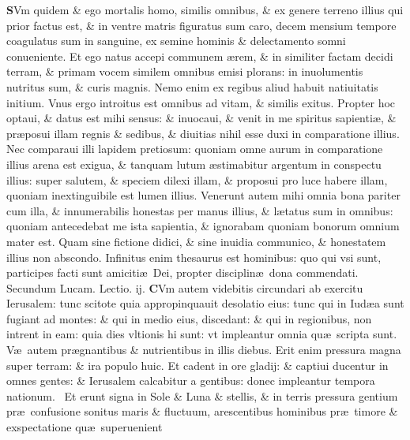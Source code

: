 \documentclass[a5paper,10pt]{book}
\def\leftmarginnote{%
	\lrmarginnote{\hskip -\marginparsep \hskip -6.5em}}
\def\rightmarginnote{%
	\lrmarginnote{\hskip\columnwidth \hskip -1em}}
\def\ae{æ}
\begin{document}
\begin{multicols*}{2}
\vspace{-1.25em}
\lettrine[lines=2]{\bfseries S}{}Vm\leftmarginnote{\begin{flushright}ca. 7.\end{flushright}} quidem \& ego mortalis homo, similis omnibus, \& ex genere terreno illius qui prior factus est, \& in ventre matris figuratus sum caro, decem mensium tempore coagulatus sum in sanguine, ex semine hominis \& delectamento somni conueniente.
Et ego natus accepi communem \ae rem, \& in similiter factam decidi terram, \& primam vocem similem omnibus emisi plorans: in inuolumentis nutritus sum, \& curis magnis.
Nemo enim ex regibus aliud habuit natiuitatis initium.
Vnus ergo introitus est omnibus ad vitam, \& similis exitus. Propter hoc optaui, \& datus est mihi sensus: \& inuocaui, \& venit in me spiritus sapienti\ae , \& pr\ae posui illam regnis \& sedibus, \& diuitias nihil esse duxi in comparatione illius.
Nec comparaui illi lapidem pretiosum: quoniam omne aurum in comparatione illius arena est exigua, \& tanquam lutum \ae stimabitur argentum in conspectu illius: super salutem, \& speciem dilexi illam, \& proposui pro luce habere illam, quoniam inextinguibile est lumen illius.
Venerunt autem mihi omnia bona pariter cum illa, \& innumerabilis honestas per manus illius, \& l\ae tatus sum in omnibus: quoniam antecedebat me ista sapientia, \& ignorabam quoniam bonorum omnium mater est.
Quam sine fictione didici, \& sine inuidia communico, \& honestatem illius non abscondo.
Infinitus enim thesaurus est hominibus: quo qui vsi sunt, participes facti sunt amiciti\ae \ Dei, propter disciplin\ae \ dona commendati.
\newline \color{red} Secundum Lucam. \hfill Lectio. ij. \color{black}
\vspace{-.25em}
\lettrine[lines=2]{\bfseries \color{red} C}{}Vm\rightmarginnote{c. 21.} autem videbitis circundari ab exercitu Ierusalem: tunc scitote quia appropinquauit desolatio eius: tunc qui in Iud\ae a sunt fugiant ad montes: \& qui in medio eius, discedant: \& qui in regionibus, non intrent in eam: quia dies vltionis hi sunt: vt impleantur omnia qu\ae \ scripta sunt.
V\ae \ autem pr\ae gnantibus \& nutrientibus in illis diebus. Erit enim pressura magna super terram: \& ira populo huic.
Et cadent in ore gladij: \& captiui ducentur in omnes gentes: \& Ierusalem calcabitur a gentibus: donec impleantur tempora nationum. \textdagger \ 
Et\rightmarginnote{E} erunt signa in Sole \& Luna \& stellis, \& in terris pressura gentium pr\ae \ confusione sonitus maris \& fluctuum, arescentibus hominibus pr\ae \ timore \& exspectatione qu\ae \ superuenient

\end{multicols*}
\end{document}
